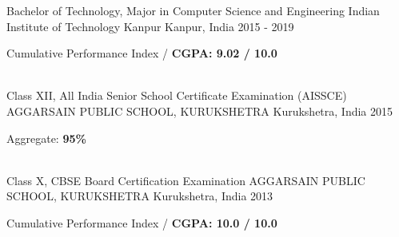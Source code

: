 \begin{cventries}
    \cventry
    {Bachelor of Technology, Major in Computer Science and Engineering}
    {Indian Institute of Technology Kanpur}
    {Kanpur, India}
    {2015 - 2019}
    {
        \begin{cvitems}
            \item {Cumulative Performance Index / \textbf{CGPA: 9.02 / 10.0}}
        \end{cvitems}
    }\\
    \vspace{1mm}
    \cventry
    {Class XII, All India Senior School Certificate Examination (AISSCE)}
    {AGGARSAIN PUBLIC SCHOOL, KURUKSHETRA}
    {Kurukshetra, India}
    {2015}
    {
        \begin{cvitems}
            \item {Aggregate: \textbf{95\%}}
        \end{cvitems}
    }\\
    \vspace{1mm}
    \cventry
    {Class X, CBSE Board Certification Examination}
    {AGGARSAIN PUBLIC SCHOOL, KURUKSHETRA}
    {Kurukshetra, India}
    {2013}
    {
        \begin{cvitems}
            \item {Cumulative Performance Index / \textbf{CGPA: 10.0 / 10.0}}
        \end{cvitems}
    }
\end{cventries}
